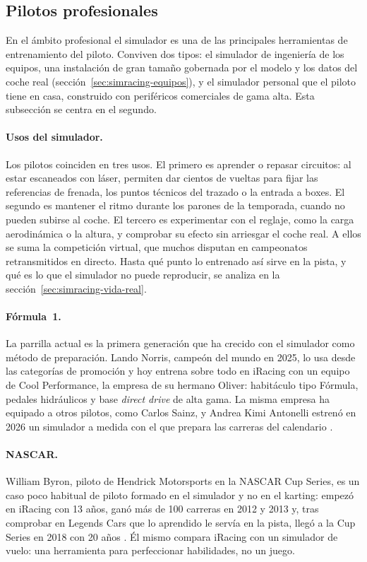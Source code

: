 

\subsection{Pilotos profesionales}
\label{sec:simracing-pilotos}
En el ámbito profesional el simulador es una de las principales herramientas de entrenamiento del piloto. Conviven dos tipos: el simulador de ingeniería de los equipos, una instalación de gran tamaño gobernada por el modelo y los datos del coche real (sección~\ref{sec:simracing-equipos}), y el simulador personal que el piloto tiene en casa, construido con periféricos comerciales de gama alta. Esta subsección se centra en el segundo.

\paragraph{Usos del simulador.}
Los pilotos coinciden en tres usos. El primero es aprender o repasar circuitos: al estar escaneados con láser, permiten dar cientos de vueltas para fijar las referencias de frenada, los puntos técnicos del trazado o la entrada a boxes. El segundo es mantener el ritmo durante los parones de la temporada, cuando no pueden subirse al coche. El tercero es experimentar con el reglaje, como la carga aerodinámica o la altura, y comprobar su efecto sin arriesgar el coche real. A ellos se suma la competición virtual, que muchos disputan en campeonatos retransmitidos en directo. Hasta qué punto lo entrenado así sirve en la pista, y qué es lo que el simulador no puede reproducir, se analiza en la sección~\ref{sec:simracing-vida-real}.

\paragraph{Fórmula~1.}
La parrilla actual es la primera generación que ha crecido con el simulador como método de preparación. Lando Norris, campeón del mundo en 2025, lo usa desde las categorías de promoción y hoy entrena sobre todo en iRacing con un equipo de Cool Performance, la empresa de su hermano Oliver: habitáculo tipo Fórmula, pedales hidráulicos y base \textit{direct drive} de alta gama. La misma empresa ha equipado a otros pilotos, como Carlos Sainz, y Andrea Kimi Antonelli estrenó en 2026 un simulador a medida con el que prepara las carreras del calendario \parencite{gpfans_2026_antonelli}.

\paragraph{NASCAR.}
William Byron, piloto de Hendrick Motorsports en la NASCAR Cup Series, es un caso poco habitual de piloto formado en el simulador y no en el karting: empezó en iRacing con 13 años, ganó más de 100 carreras en 2012 y 2013 y, tras comprobar en Legends Cars que lo aprendido le servía en la pista, llegó a la Cup Series en 2018 con 20 años \parencite{motorsport_com}. Él mismo compara iRacing con un simulador de vuelo: una herramienta para perfeccionar habilidades, no un juego.

